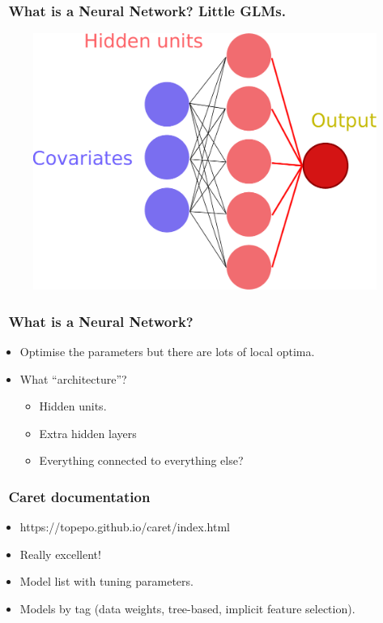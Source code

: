 \documentclass[handout, aspectratio = 169]{beamer}
\begin{document}
\begin{frame}
\frametitle{\insertframenumber~What is a Neural Network? Little GLMs.}

\vspace{6mm}
\begin{figure}
    \includegraphics[height = 0.7\textheight]{neural_network3.pdf}
\end{figure} 
\end{frame} 



\begin{frame}
\frametitle{\insertframenumber~What is a Neural Network?}

\begin{itemize}
\item Optimise the parameters but there are lots of local optima.
\item What ``architecture''?
	\begin{itemize}
	\item Hidden units.
	\item Extra hidden layers
	\item Everything connected to everything else?
	\end{itemize}
\end{itemize}
\end{frame} 


\begin{frame}
\frametitle{\insertframenumber~Caret documentation}

\begin{itemize}
\item https://topepo.github.io/caret/index.html
\item Really excellent!
\item Model list with tuning parameters.
\item Models by tag (data weights, tree-based, implicit feature selection).
\end{itemize}
\end{frame} 
\end{document}
